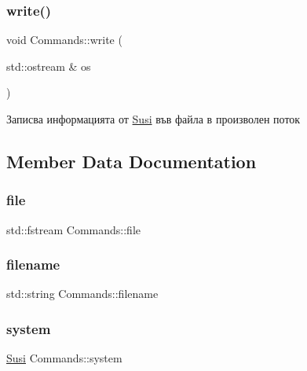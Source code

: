 \subsubsection{\texorpdfstring{write()}{write()}\hspace{0.1cm}{\footnotesize\ttfamily [2/2]}}
{\footnotesize\ttfamily void Commands\+::write (\begin{DoxyParamCaption}\item[{std\+::ostream \&}]{os }\end{DoxyParamCaption})}



Записва информацията от \hyperlink{class_susi}{Susi} във файла в произволен поток 



\subsection{Member Data Documentation}
\mbox{\label{class_commands_a9e7fe16e45925df6eb4c5d3ebcdf27d5}} 
\subsubsection{\texorpdfstring{file}{file}}
{\footnotesize\ttfamily std\+::fstream Commands\+::file\hspace{0.3cm}{\ttfamily [private]}}

\mbox{\label{class_commands_ae66931a1748a7543fa6089f16e815ad2}} 
\subsubsection{\texorpdfstring{filename}{filename}}
{\footnotesize\ttfamily std\+::string Commands\+::filename\hspace{0.3cm}{\ttfamily [private]}}

\mbox{\label{class_commands_a70ae07baccbd18977008ae6f17c6c32c}} 
\subsubsection{\texorpdfstring{system}{system}}
{\footnotesize\ttfamily \hyperlink{class_susi}{Susi} Commands\+::system\hspace{0.3cm}{\ttfamily [private]}}

